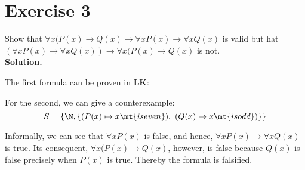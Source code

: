 \section{Exercise 3}

Show that $\forall x(P(x) \rightarrow Q(x) \rightarrow \forall x P(x) \rightarrow \forall x Q(x)$ is valid but hat $(\forall x P(x) \rightarrow \forall x Q(x)) \rightarrow \forall x(P(x) \rightarrow Q(x)$ is not.\\

\noindent
\textbf{Solution.}

\noindent
The first formula can be proven in \textbf{LK}:

\begin{prooftree}
\end{prooftree}

\noindent
For the second, we can give a counterexample:
$$
	S = \{\N, \{(P(x) \mapsto x \mt{ is even}),\ (Q(x) \mapsto x \mt{ is odd})\}\}
$$

\noindent
Informally, we can see that $\forall x P(x)$ is false, and hence, $\forall x P(x) \rightarrow \forall x Q(x)$ is true. Its consequent, $\forall x(P(x) \rightarrow Q(x)$, however, is false because $Q(x)$ is false precisely when $P(x)$ is true. Thereby the formula is falsified.

